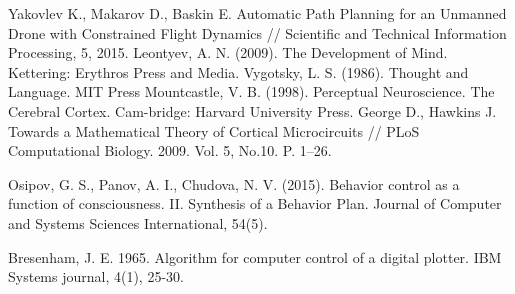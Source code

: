 \documentclass[runningheads,a4paper]{llncs}
\begin{document}
\begin{thebibliography}{4}
 Yakovlev K., Makarov D., Baskin E. Automatic Path Planning for an Unmanned Drone with Constrained Flight Dynamics // Scientific and Technical Information Processing, 5, 2015.
 Leontyev, A. N. (2009). The Development of Mind. Kettering: Erythros Press and Media.
 Vygotsky, L. S. (1986). Thought and Language. MIT Press
 Mountcastle, V. B. (1998). Perceptual Neuroscience. The Cerebral Cortex. Cam-bridge: Harvard University Press.
 George D., Hawkins J. Towards a Mathematical Theory of Cortical Microcircuits // PLoS Computational Biology. 2009. Vol. 5, No.10. P. 1--26.

 Osipov, G. S., Panov, A. I., Chudova, N. V. (2015). Behavior control as a function of consciousness. II. Synthesis of a Behavior Plan. Journal of Computer and Systems Sciences International, 54(5).

 Bresenham, J. E. 1965. Algorithm for computer control of a digital plotter. IBM Systems journal, 4(1), 25-30.

\end{thebibliography}
\end{document}
